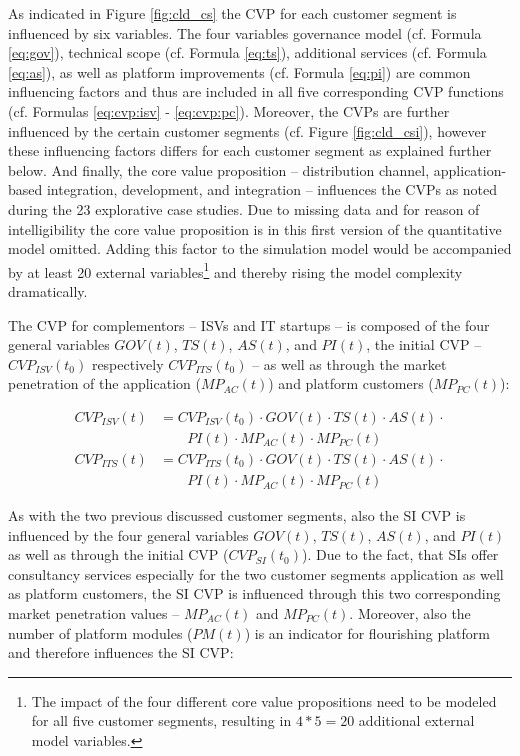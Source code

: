 As indicated in Figure \ref{fig:cld_cs} the \ac{CVP} for each customer segment is influenced by six variables. The four variables governance model (cf. Formula \ref{eq:gov}), technical scope (cf. Formula \ref{eq:ts}), additional services (cf. Formula \ref{eq:as}), as well as platform improvements (cf. Formula \ref{eq:pi}) are common influencing factors and thus are included in all five corresponding \ac{CVP} functions (cf. Formulas \ref{eq:cvp:isv} - \ref{eq:cvp:pc}). Moreover, the \acp{CVP} are further influenced by the certain customer segments (cf. Figure \ref{fig:cld_csi}), however these influencing factors differs for each customer segment as explained further below. And finally, the core value proposition -- distribution channel, application-based integration, development, and integration -- influences the \acp{CVP} as noted during the 23 explorative case studies. Due to missing data and for reason of intelligibility the core value proposition is in this first version of the quantitative model omitted. Adding this factor to the simulation model would be accompanied by at least 20 external variables\footnote{The impact of the four different core value propositions need to be modeled for all five customer segments, resulting in $4*5=20$ additional external model variables.} and thereby rising the model complexity dramatically.

The \ac{CVP} for complementors -- \acp{ISV} and \ac{IT} startups -- is composed of the four general variables $GOV(t)$, $TS(t)$, $AS(t)$, and $PI(t)$, the initial \ac{CVP} -- $CVP_{ISV}(t_0)$ respectively $ CVP_{ITS}(t_0)$ -- as well as through the market penetration of the application ($MP_{AC}(t)$) and platform customers ($MP_{PC}(t)$):

\begin{align}
		CVP_{ISV}(t) &= CVP_{ISV}(t_0) \cdot GOV(t) \cdot TS(t) \cdot AS(t) \cdot \nonumber \\ &\qquad PI(t) \cdot MP_{AC}(t) \cdot MP_{PC}(t)\label{eq:cvp:isv}\\
		CVP_{ITS}(t) &= CVP_{ITS}(t_0) \cdot GOV(t) \cdot TS(t) \cdot AS(t) \cdot \nonumber \\ &\qquad PI(t) \cdot MP_{AC}(t) \cdot MP_{PC}(t)\label{eq:cvp:its}
\end{align}

As with the two previous discussed customer segments, also the \ac{SI} \ac{CVP} is influenced by the four general variables $GOV(t)$, $TS(t)$, $AS(t)$, and $PI(t)$ as well as through the initial \ac{CVP} ($CVP_{SI}(t_0)$). Due to the fact, that \acp{SI} offer consultancy services especially for the two customer segments application as well as platform customers, the \ac{SI} \ac{CVP} is influenced through this two corresponding market penetration values -- $MP_{AC}(t)$ and $MP_{PC}(t)$. Moreover, also the number of platform modules ($PM(t)$) is an indicator for flourishing platform and therefore influences the \ac{SI} \ac{CVP}:

